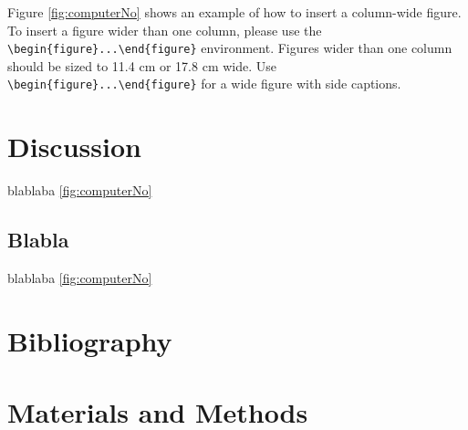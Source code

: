 \documentclass[times, twoside, watermark]{zHenriquesLab-StyleBioRxiv}
\begin{document}
Figure \ref{fig:computerNo} shows an example of how to insert a column-wide figure. To insert a figure wider than one column, please use the \verb|\begin{figure}...\end{figure}| environment. Figures wider than one column should be sized to 11.4 cm or 17.8 cm wide. Use \verb|\begin{figure}...\end{figure}| for a wide figure with side captions.

\section*{Discussion}

blablaba \ref{fig:computerNo} 
\blindtext

\subsection*{Blabla} 
\blindtext


blablaba \ref{fig:computerNo}
\blindtext

\begin{acknowledgements}
\blindtext
\end{acknowledgements}

\section*{Bibliography}


\onecolumn
\newpage

\section*{Materials and Methods}
\end{document}
